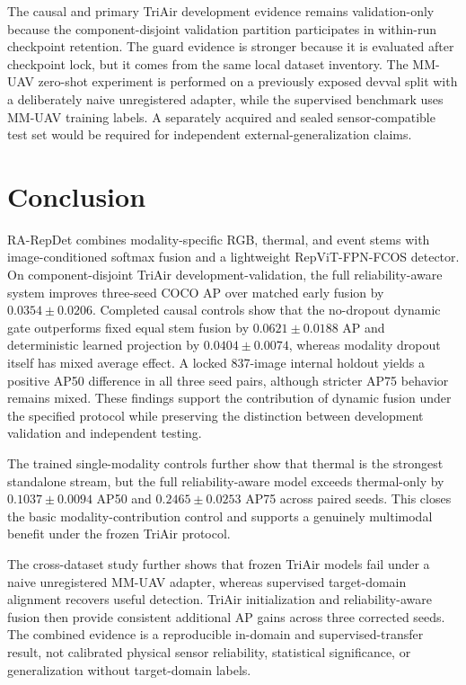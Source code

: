 The causal and primary TriAir development evidence remains validation-only because the component-disjoint validation partition participates in within-run checkpoint retention. The guard evidence is stronger because it is evaluated after checkpoint lock, but it comes from the same local dataset inventory. The MM-UAV zero-shot experiment is performed on a previously exposed devval split with a deliberately naive unregistered adapter, while the supervised benchmark uses MM-UAV training labels. A separately acquired and sealed sensor-compatible test set would be required for independent external-generalization claims.

\section{Conclusion}
RA-RepDet combines modality-specific RGB, thermal, and event stems with image-conditioned softmax fusion and a lightweight RepViT-FPN-FCOS detector. On component-disjoint TriAir development-validation, the full reliability-aware system improves three-seed COCO AP over matched early fusion by $0.0354\pm0.0206$. Completed causal controls show that the no-dropout dynamic gate outperforms fixed equal stem fusion by $0.0621\pm0.0188$ AP and deterministic learned projection by $0.0404\pm0.0074$, whereas modality dropout itself has mixed average effect. A locked 837-image internal holdout yields a positive AP50 difference in all three seed pairs, although stricter AP75 behavior remains mixed. These findings support the contribution of dynamic fusion under the specified protocol while preserving the distinction between development validation and independent testing.

The trained single-modality controls further show that thermal is the strongest standalone stream, but the full reliability-aware model exceeds thermal-only by $0.1037\pm0.0094$ AP50 and $0.2465\pm0.0253$ AP75 across paired seeds. This closes the basic modality-contribution control and supports a genuinely multimodal benefit under the frozen TriAir protocol.

The cross-dataset study further shows that frozen TriAir models fail under a naive unregistered MM-UAV adapter, whereas supervised target-domain alignment recovers useful detection. TriAir initialization and reliability-aware fusion then provide consistent additional AP gains across three corrected seeds. The combined evidence is a reproducible in-domain and supervised-transfer result, not calibrated physical sensor reliability, statistical significance, or generalization without target-domain labels.

